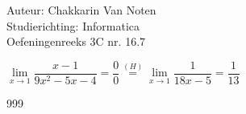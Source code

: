 \documentclass[a4paper]{article}
\begin{document}
  
\noindent \large Auteur: Chakkarin Van Noten \\
\noindent \large Studierichting: Informatica\\
\noindent \large Oefeningenreeks 3C nr. 16.7\\

\medskip

\normalsize

$\lim\limits_{x \to 1} \dfrac{x-1}{9x^2-5x-4} = \dfrac{0}{0} \stackrel{(H)}{=} \lim\limits_{x \to 1} \dfrac{1}{18x-5} = \dfrac{1}{13}$

\begin{thebibliography}{999}
\end{thebibliography}
\end{document}
